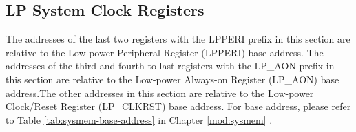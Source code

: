 \documentclass[main\_\_EN.tex]{subfiles}
\begin{document}



\subsection{LP System Clock Registers}


The addresses of the last two registers with the LPPERI prefix in this section are relative to the Low-power Peripheral Register (LPPERI) base address.  The addresses of the third and fourth to last registers with the LP\_AON prefix in this section are relative to the Low-power Always-on Register (LP\_AON) base address.The other addresses in this section are relative to the Low-power Clock/Reset Register (LP\_CLKRST) base address. For base address, please refer to Table  \ref{tab:sysmem-base-address} in Chapter \ref{mod:sysmem} \textit{}.



\end{document}
